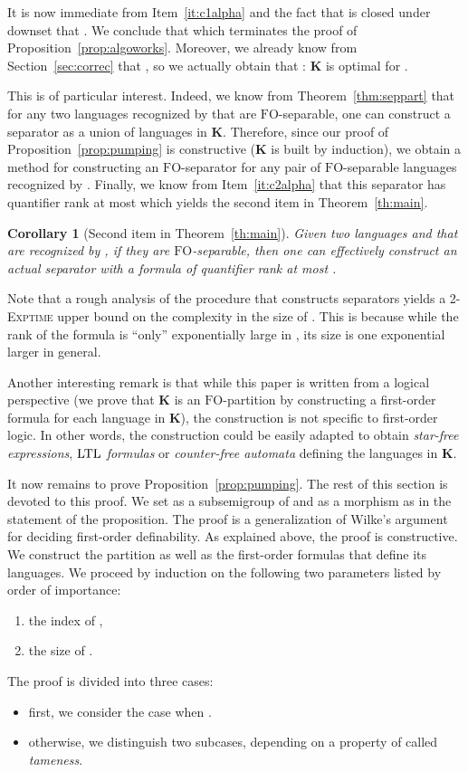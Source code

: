 \documentclass{CSML}
\newcommand\Kb{\ensuremath{\mathbf{K}}\xspace}
\newcommand{\ltl}{\ensuremath{\textup{LTL}}\xspace}
\newcommand{\fo}{\ensuremath{\text{FO}}\xspace}
\theoremstyle{plain}
\newtheorem{corollary}[thm]{Corollary}
\begin{document}
It is now immediate from Item~\ref{it:c1alpha} and the fact that
 is closed under downset that . We conclude that  which terminates the proof of
Proposition~\ref{prop:algoworks}. Moreover, we already know from Section~\ref{sec:correc} that
, so we actually obtain that
: \Kb is optimal for .

This is of particular interest. Indeed, we know from Theorem~\ref{thm:seppart}
that for any two languages recognized by  that are \fo-separable, one
can construct a separator as a union of languages in \Kb. Therefore, since our
proof of Proposition~\ref{prop:pumping} is constructive (\Kb is built by
induction), we obtain a method for constructing an \fo-separator for any pair
of \fo-separable languages recognized by . Finally, we know from Item~\ref{it:c2alpha} that
this separator has quantifier rank at most  which yields the
second item in Theorem~\ref{th:main}.

\begin{corollary}[Second item in Theorem~\ref{th:main}]
Given two languages  and  that are recognized by ,
if they are \fo-separable, then one can effectively construct an actual separator with
a formula of quantifier rank at most .
\end{corollary}

Note that a rough analysis of the procedure that constructs separators
yields a 2-\textsc{Exptime} upper bound on the complexity in the size of
. This is because while the rank of the formula is ``only''
exponentially large in , its size is one exponential larger in
general.

Another interesting remark is that while this paper is written from a
logical perspective (we prove that \Kb is an \fo-partition by
constructing a first-order formula for each language in \Kb), the
construction is not specific to first-order logic. In other words, the
construction could be easily adapted to obtain \emph{star-free
  expressions}, \emph{\ltl formulas} or \emph{counter-free automata}
defining the languages in \Kb.

\bigskip

It now remains to prove Proposition~\ref{prop:pumping}. The rest
of this section is devoted to this proof. We set  as a
subsemigroup of  and  as a morphism as
in the statement of the proposition. The proof is a generalization of
Wilke's argument~\cite{wfo} for deciding first-order definability. As
explained above, the proof is constructive. We construct the partition
 as well as the first-order formulas that define its languages.
We proceed by induction on the following two parameters listed by
order of importance:
\begin{enumerate}[label=]
\item the index  of ,
\item the size of .
\end{enumerate}
The proof is divided into three cases:
\begin{itemize}
\item first, we consider the case when .
\item otherwise, we distinguish two subcases, depending
on a property of  called \emph{tameness}.
\end{itemize}
\end{document}
